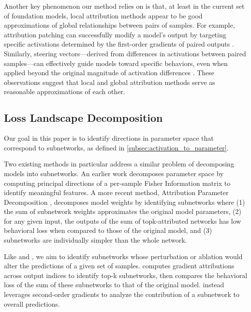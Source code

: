 \documentclass{article}
\theoremstyle{plain}
\theoremstyle{definition}
\theoremstyle{remark}
\begin{document}
Another key phenomenon our method relies on is that, at least in the current set of foundation models, local attribution methods appear to be good approximations of global relationships between pairs of samples. For example, attribution patching can successfully modify a model’s output by targeting specific activations determined by the first-order gradients of paired outputs \cite{nanda2023attribution,kramar2024atp,syed2023attribution}. Similarly, steering vectors—derived from differences in activations between paired samples—can effectively guide models toward specific behaviors, even when applied beyond the original magnitude of activation differences \cite{turner2023steering,subramani2022extracting}. These observations suggest that local and global attribution methods serve as reasonable approximations of each other.

\subsection{Loss Landscape Decomposition}\label{subsec:loss_landscape_decomp}
Our goal in this paper is to identify directions in parameter space that correspond to subnetworks, as defined in \ref{subsec:activation_to_parameter}.

Two existing methods in particular address a similar problem of decomposing models into subnetworks. An earlier work \cite{matena2023npeff} decomposes parameter space by computing principal directions of a per-sample Fisher Information matrix to identify meaningful features. A more recent method, Attribution Parameter Decomposition \cite{braun2025interpretability}, decomposes model weights by identifying subnetworks where (1) the sum of subnetwork weights approximates the original model parameters, (2) for any given input, the outputs of the sum of topk-attributed networks has low behavioral loss when compared to those of the original model, and (3) subnetworks are individually simpler than the whole network.  

Like \cite{braun2025interpretability} and \cite{matena2023npeff}, we aim to identify subnetworks whose perturbation or ablation would alter the predictions of a given set of samples. \cite{braun2025interpretability} computes gradient attributions across output indices to identify top-k subnetworks, then compares the behavioral loss of the sum of these subnetworks to that of the original model. \cite{matena2023npeff} instead leverages second-order gradients to analyze the contribution of a subnetwork to overall predictions.
\end{document}
